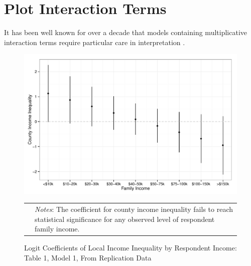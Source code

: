 
\section{Plot Interaction Terms}

It has been well known for over a decade that models containing multiplicative interaction terms require particular care in interpretation \citep[see, e.g.,][]{Golder2003, Braumoeller2004, Brambor2006, Kam2007}.



\begin{figure}[htbp] 
  \caption{Logit Coefficients of Local Income Inequality by Respondent Income: Table 1, Model 1, From Replication Data}
  \label{F:coef.t1m1}
  \begin{center}
    \includegraphics[width=5.25in]{../figures/07_plot_interaction_terms_t1m1.pdf}
  \end{center}
  \begin{footnotesize}
  \begin{tabular}{p{.1in} p{5.1in}}
  & \emph{Notes}: The coefficient for county income inequality fails to reach statistical significance for any observed level of respondent family income.
  \end{tabular}
  \end{footnotesize}
\end{figure}


